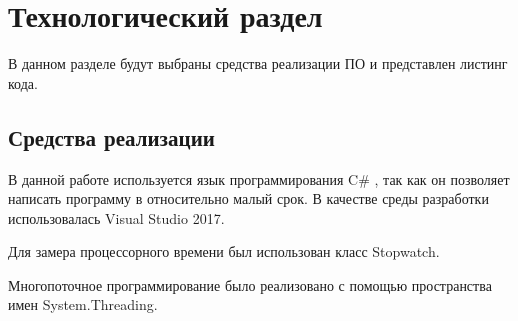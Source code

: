 \chapter{ Технологический раздел}
\label{cha:technological}

    В данном разделе будут выбраны средства реализации ПО и представлен листинг кода. 

    \section{Средства реализации}
        В данной работе используется язык программирования C\# \cite{Charp}, так как
        он позволяет написать программу в относительно малый срок.
        В качестве среды разработки использовалась Visual Studio 2017. \cite{visual-studio}

        Для замера процессорного времени был использован класс Stopwatch. \cite{stopwatch}

	Многопоточное программирование было реализовано с помощью пространства имен System.Threading. \cite{thread}


